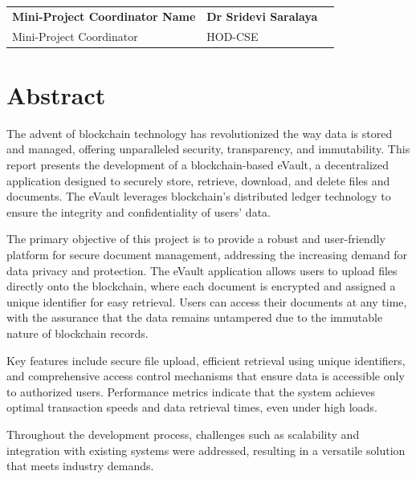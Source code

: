 \documentclass[12pt,a4paper]{report}
\begin{document}
\vspace{0.55in}
\par
\vspace{0.65in}

\begin{tabularx}{0.95 \textwidth} { 
   >{\raggedright\arraybackslash}X 
   >{\centering\arraybackslash}X 
   >{\raggedleft\arraybackslash}X  }
     \textbf{Mini-Project Coordinator Name} &  \textbf{Dr Sridevi Saralaya}\\
     Mini-Project Coordinator &   HOD-CSE \\
\end{tabularx}





\pagestyle{plain}
\chapter*{Abstract}
The advent of blockchain technology has revolutionized the 
way data is stored and managed, offering unparalleled security, 
transparency, and immutability. This report presents the 
development of a blockchain-based eVault, a decentralized 
application designed to securely store, retrieve, download, 
and delete files and documents. The eVault leverages blockchain's 
distributed ledger technology to ensure the integrity and 
confidentiality of users' data.

The primary objective of this project is to provide a robust 
and user-friendly platform for secure document management, 
addressing the increasing demand for data privacy and protection. 
The eVault application allows users to upload files directly 
onto the blockchain, where each document is encrypted and 
assigned a unique identifier for easy retrieval. Users can 
access their documents at any time, with the assurance that 
the data remains untampered due to the immutable nature of 
blockchain records.
 
Key features include secure file upload, efficient retrieval 
using unique identifiers, and comprehensive access control 
mechanisms that ensure data is accessible only to authorized 
users. Performance metrics indicate that the system achieves 
optimal transaction speeds and data retrieval times, even 
under high loads.

Throughout the development process, challenges such as 
scalability and integration with existing systems were 
addressed, resulting in a versatile solution that meets industry 
demands. 
\end{document}
